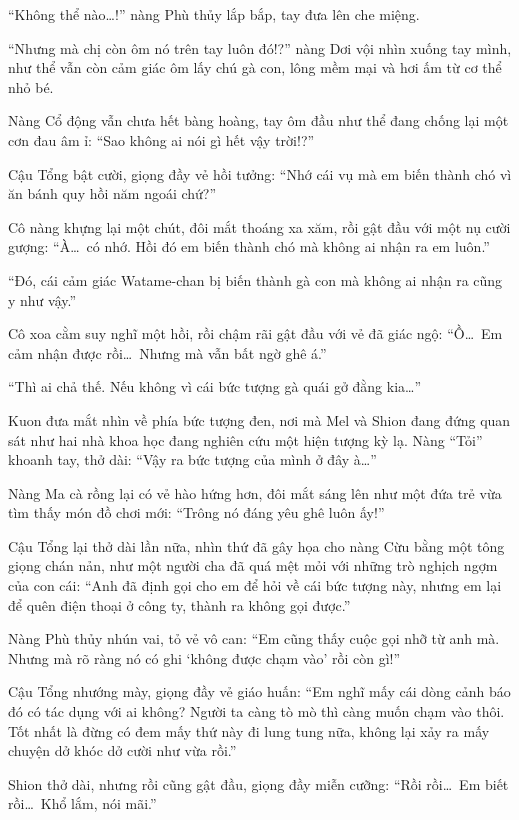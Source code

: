 \documentclass[../main.tex]{subfiles}
\begin{document}
``Không thể nào\dots!'' nàng Phù thủy lắp bắp, tay đưa lên che miệng.

``Nhưng mà chị còn ôm nó trên tay luôn đó!?'' nàng Dơi vội nhìn xuống tay mình, như thể vẫn còn cảm giác ôm lấy chú gà con, lông mềm mại và hơi ấm từ cơ thể nhỏ bé.

Nàng Cổ động vẫn chưa hết bàng hoàng, tay ôm đầu như thể đang chống lại một cơn đau âm ỉ: ``Sao không ai nói gì hết vậy trời!?''

Cậu Tổng bật cười, giọng đầy vẻ hồi tưởng: ``Nhớ cái vụ mà em biến thành chó vì ăn bánh quy hồi năm ngoái chứ?''

Cô nàng khựng lại một chút, đôi mắt thoáng xa xăm, rồi gật đầu với một nụ cười gượng: ``À\dots\ có nhớ. Hồi đó em biến thành chó mà không ai nhận ra em luôn.''

``Đó, cái cảm giác Watame-chan bị biến thành gà con mà không ai nhận ra cũng y như vậy.''

Cô xoa cằm suy nghĩ một hồi, rồi chậm rãi gật đầu với vẻ đã giác ngộ: ``Ồ\dots\ Em cảm nhận được rồi\dots\ Nhưng mà vẫn bất ngờ ghê á.''

``Thì ai chả thế. Nếu không vì cái bức tượng gà quái gở đằng kia\dots''

Kuon đưa mắt nhìn về phía bức tượng đen, nơi mà Mel và Shion đang đứng quan sát như hai nhà khoa học đang nghiên cứu một hiện tượng kỳ lạ. Nàng ``Tỏi'' khoanh tay, thở dài: ``Vậy ra bức tượng của mình ở đây à\dots''

Nàng Ma cà rồng lại có vẻ hào hứng hơn, đôi mắt sáng lên như một đứa trẻ vừa tìm thấy món đồ chơi mới: ``Trông nó đáng yêu ghê luôn ấy!''

Cậu Tổng lại thở dài lần nữa, nhìn thứ đã gây họa cho nàng Cừu bằng một tông giọng chán nản, như một người cha đã quá mệt mỏi với những trò nghịch ngợm của con cái: ``Anh đã định gọi cho em để hỏi về cái bức tượng này, nhưng em lại để quên điện thoại ở công ty, thành ra không gọi được.''

Nàng Phù thủy nhún vai, tỏ vẻ vô can: ``Em cũng thấy cuộc gọi nhỡ từ anh mà. Nhưng mà rõ ràng nó có ghi `không được chạm vào' rồi còn gì!''

Cậu Tổng nhướng mày, giọng đầy vẻ giáo huấn: ``Em nghĩ mấy cái dòng cảnh báo đó có tác dụng với ai không? Người ta càng tò mò thì càng muốn chạm vào thôi. Tốt nhất là đừng có đem mấy thứ này đi lung tung nữa, không lại xảy ra mấy chuyện dở khóc dở cười như vừa rồi.''

Shion thở dài, nhưng rồi cũng gật đầu, giọng đầy miễn cưỡng: ``Rồi rồi\dots\ Em biết rồi\dots\ Khổ lắm, nói mãi.''
\end{document}
